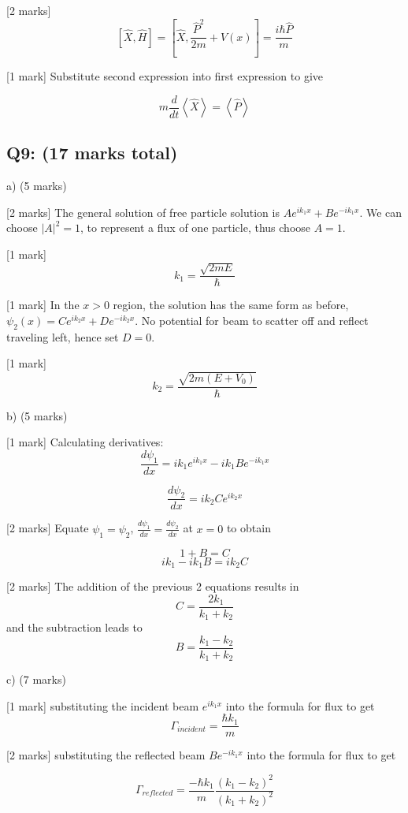 \documentclass[a4paper,11pt]{article}
\begin{document}
[2 marks] \[\left[ \hat{X}, \hat{H}\right] = \left[ \hat{X}, \frac{\hat{P}^{2}}{2m} + V(x)\right] = \frac{i\hbar \hat{P}}{m} \]

[1 mark] Substitute second expression into first expression to give 

\[m \frac{d}{dt}\left<\hat{X}\right> =  \left<\hat{P}\right> \]

\subsection*{Q9: (17 marks total) }

a) (5 marks)

[2 marks] The general solution of free particle solution is \( Ae^{ik_{1}x} + Be^{-ik_{1}x} \). We can choose \( |A|^{2} = 1 \), to represent a flux of one particle, thus choose \( A = 1 \). 

[1 mark] \[ k_1 = \frac{\sqrt{2mE}}{\hbar} \]

[1 mark] In the \( x > 0 \) region, the solution has the same form as before, \( \psi_{2}(x) = Ce^{ik_{2}x} + De^{-ik_{2}x} \). No potential for beam to scatter off and reflect traveling left, hence set \( D = 0 \). 

[1 mark] \[k_{2} = \frac{\sqrt{2m(E+V_0)}}{\hbar} \]

b) (5 marks)

[1 mark] Calculating derivatives:
\[ \frac{d\psi_1}{dx} = ik_{1}e^{ik_{1}x} - ik_{1}Be^{-ik_{1}x} \]

\[ \frac{d\psi_2}{dx} = ik_{2}Ce^{ik_{2}x} \]

[2 marks] Equate \( \psi_{1} = \psi_{2} \), \( \frac{d\psi_1}{dx} = \frac{d\psi_2}{dx} \) at \(x = 0\) to obtain

\[1 + B = C\]
\[ik_{1} - ik_{1}B = ik_{2}C\]

[2 marks] The addition of the previous 2 equations results in \[ C = \frac{2k_{1}}{k_{1}+k_{2}} \] and the subtraction leads to  \[ B = \frac{k_{1}-k_{2}}{k_{1}+k_{2}} \]

c) (7 marks)

[1 mark] substituting the incident beam \( e^{ik_{1}x} \) into the formula for flux to get \[\Gamma_{incident} = \frac{\hbar k_{1}}{m} \]

[2 marks] substituting the reflected beam \( Be^{-ik_{1}x} \) into the formula for flux to get 

\[ 
\Gamma_{reflected} = \frac{-\hbar k_{1}}{m}\frac{\left(k_{1} - k_{2} \right)^{2}}{ \left(k_{1} + k_{2} \right)^{2}} 
\]
\end{document}
